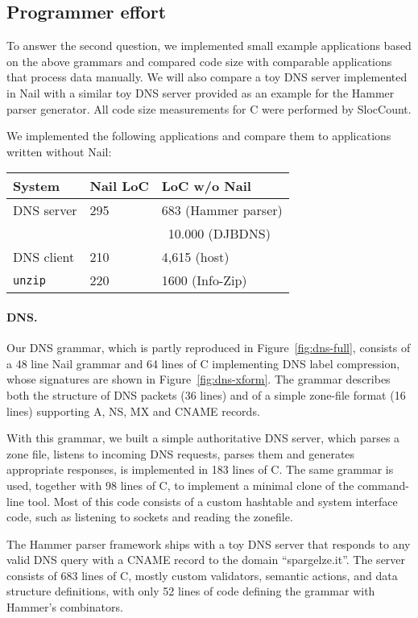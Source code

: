 \subsection{Programmer effort}


\label{s:eval-effort}
To answer the second question, we implemented small example applications based on the above
grammars and compared code size with comparable applications that process data manually. We will
also compare a toy DNS server implemented in Nail with a similar toy DNS server provided as an
example for the Hammer parser generator. All code size measurements for C were performed by
SlocCount\cite{sloccount}.

\noindent We implemented the following applications and compare them to applications written without
Nail:

\noindent\begin{tabular}{@{}lll@{}} 
\toprule
\textbf{System} & \textbf{Nail LoC}  & \textbf{LoC w/o Nail} \\
\midrule
DNS server & 295 & 683 (Hammer parser)\\
&&  ~10.000 (DJBDNS)\\ 
DNS client & 210  & 4,615 (host) \\
\texttt{unzip} & 220 & 1600 (Info-Zip) \\
\bottomrule
\end{tabular}
\paragraph{DNS.}

Our DNS grammar, which is partly reproduced in Figure~\ref{fig:dns-full}, consists of a 48 line Nail
grammar and 64 lines of C implementing DNS label compression, whose signatures are shown in
Figure~\ref{fig:dns-xform}.
The grammar describes both the structure of DNS packets (36 lines) and of a simple zone-file format
(16 lines) supporting A, NS, MX and CNAME records. 

  
With this grammar, we built a simple authoritative DNS server, which parses a zone file, listens to incoming DNS
requests, parses them and generates appropriate responses, is implemented in 183 lines of C. The
same grammar is used, together with 98 lines of C, to implement a minimal clone of the
 command-line tool. Most of this code consists of a custom hashtable and system
interface code, such as listening to sockets and reading the zonefile. 

The Hammer parser framework\cite{hammer-parser} ships with a toy DNS server that responds to
any valid DNS query with a CNAME record to the domain ``spargelze.it''. 
The server consists of 683 lines of C, mostly custom validators, semantic actions,
and data structure definitions, with only 52 lines of code defining the
grammar with Hammer's combinators.

